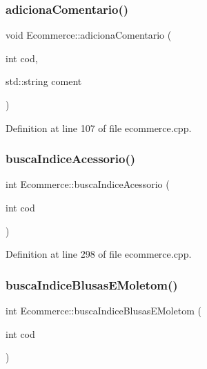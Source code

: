 \subsubsection{\texorpdfstring{adiciona\+Comentario()}{adicionaComentario()}}
{\footnotesize\ttfamily void Ecommerce\+::adiciona\+Comentario (\begin{DoxyParamCaption}\item[{int}]{cod,  }\item[{std\+::string}]{coment }\end{DoxyParamCaption})}



Definition at line 107 of file ecommerce.\+cpp.

\mbox{\label{class_ecommerce_ab21ff2a4e6ddd10b01b6cd8e7b8823f8}} 
\subsubsection{\texorpdfstring{busca\+Indice\+Acessorio()}{buscaIndiceAcessorio()}}
{\footnotesize\ttfamily int Ecommerce\+::busca\+Indice\+Acessorio (\begin{DoxyParamCaption}\item[{int}]{cod }\end{DoxyParamCaption})}



Definition at line 298 of file ecommerce.\+cpp.

\mbox{\label{class_ecommerce_a99b2d10659b9fe41cc9f5a44cf8a2977}} 
\subsubsection{\texorpdfstring{busca\+Indice\+Blusas\+E\+Moletom()}{buscaIndiceBlusasEMoletom()}}
{\footnotesize\ttfamily int Ecommerce\+::busca\+Indice\+Blusas\+E\+Moletom (\begin{DoxyParamCaption}\item[{int}]{cod }\end{DoxyParamCaption})}



